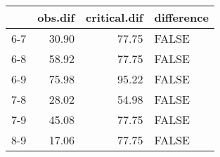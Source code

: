 \begin{table}[ht]
\centering
\begin{tabular}{rrrl}
  \hline
 & obs.dif & critical.dif & difference \\ 
  \hline
6-7 & 30.90 & 77.75 & FALSE \\ 
  6-8 & 58.92 & 77.75 & FALSE \\ 
  6-9 & 75.98 & 95.22 & FALSE \\ 
  7-8 & 28.02 & 54.98 & FALSE \\ 
  7-9 & 45.08 & 77.75 & FALSE \\ 
  8-9 & 17.06 & 77.75 & FALSE \\ 
   \hline
\end{tabular}
\end{table}

